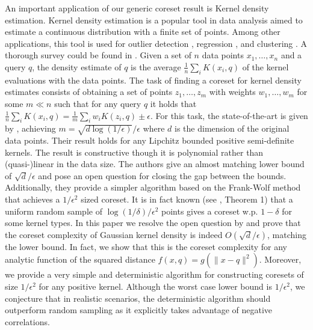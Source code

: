 \documentclass[anon,12pt]{colt2019} %
\newcommand{\eps}{\epsilon}
\begin{document}

An important application of our generic coreset result is Kernel density estimation.
Kernel density estimation is a popular tool in data analysis aimed to estimate a continuous distribution with a finite set of points. Among other applications, this tool is used for outlier detection \cite{schubert2014generalized}, regression \cite{fan2018local}, and clustering \cite{rinaldo2010generalized}. A thorough survey could be found in \cite{silverman2018density}. Given a set of $n$ data points $x_1,\ldots,x_n$ and a query $q$, the density estimate of $q$ is the average $\frac{1}{n} \sum_i K(x_i,q)$ of the kernel evaluations with the data points. The task of finding a coreset for kernel density estimates consists of obtaining a set of points $z_1,\ldots,z_m$ with weights $w_1,\ldots,w_m$ for some $m \ll n$ such that for any query $q$ it holds that 
$\frac{1}{n} \sum_i K(x_i,q) = \frac{1}{m} \sum_i w_i K(z_i,q) \pm \eps$. For this task, the state-of-the-art is given by \cite{DBLP:journals/corr/abs-1802-01751}, achieving $m=\sqrt{d\log(1/\eps)}/\eps$ where $d$ is the dimension of the original data points. Their result holds for any Lipchitz bounded positive semi-definite kernels. The result is constructive though it is polynomial rather than (quasi-)linear in the data size. The authors give an almost matching lower bound of $\sqrt{d}/\eps$ and pose an open question for closing the gap between the bounds. Additionally, they provide a simpler algorithm based on the Frank-Wolf method that achieves a $1/\eps^2$ sized coreset. It is in fact known (see \cite{lopez2015towards}, Theorem 1) that a uniform random sample of $\log(1/\delta)/\eps^2$ points gives a coreset w.p. $1-\delta$ for some kernel types. 
In this paper we resolve the open question by \cite{DBLP:journals/corr/abs-1802-01751} and prove that the coreset complexity of Gaussian kernel density is indeed $O(\sqrt{d}/\eps)$, matching the lower bound. 
In fact, we show that this is the coreset complexity for any analytic function of the squared distance $f(x,q) = g(\|x-q\|^2)$.
Moreover, we provide a very simple and deterministic algorithm for constructing coresets of size $1/\eps^2$ for any positive kernel. Although the worst case lower bound is $1/\eps^2$, we conjecture that in realistic scenarios, the deterministic algorithm should outperform random sampling as it explicitly takes advantage of negative correlations.
\end{document}
